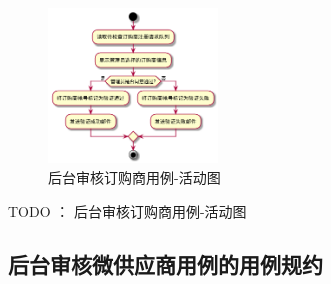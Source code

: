 \begin{figure}[htp]
    \centering
    \includegraphics[width=0.4\textwidth]{figure/usecase/uc_sub/uc_admin_check_client.png}
    \caption{后台审核订购商用例-活动图}
    \label{fig:shenhe-order-uml}
\end{figure}
TODO ： 后台审核订购商用例-活动图



\subsection{后台审核微供应商用例的用例规约}


